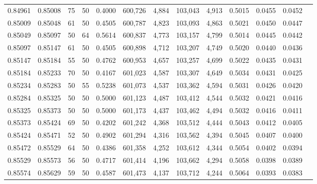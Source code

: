 \begin{tabular}{rrrrrrrrrrrrr}
0.84961 & 0.85008 &    75 &  50 &                                     0.4000 & 600,726 &   4,884 & 103,043 &   4,913 & 0.5015 & 0.0455 & 0.0452 \\
0.85009 & 0.85048 &    61 &  50 &                                     0.4505 & 600,787 &   4,823 & 103,093 &   4,863 & 0.5021 & 0.0450 & 0.0447 \\
0.85049 & 0.85097 &    50 &  64 &                                     0.5614 & 600,837 &   4,773 & 103,157 &   4,799 & 0.5014 & 0.0445 & 0.0442 \\
0.85097 & 0.85147 &    61 &  50 &                                     0.4505 & 600,898 &   4,712 & 103,207 &   4,749 & 0.5020 & 0.0440 & 0.0436 \\
0.85147 & 0.85184 &    55 &  50 &                                     0.4762 & 600,953 &   4,657 & 103,257 &   4,699 & 0.5022 & 0.0435 & 0.0431 \\
0.85184 & 0.85233 &    70 &  50 &                                     0.4167 & 601,023 &   4,587 & 103,307 &   4,649 & 0.5034 & 0.0431 & 0.0425 \\
0.85234 & 0.85283 &    50 &  55 &                                     0.5238 & 601,073 &   4,537 & 103,362 &   4,594 & 0.5031 & 0.0426 & 0.0420 \\
0.85284 & 0.85325 &    50 &  50 &                                     0.5000 & 601,123 &   4,487 & 103,412 &   4,544 & 0.5032 & 0.0421 & 0.0416 \\
0.85325 & 0.85373 &    50 &  50 &                                     0.5000 & 601,173 &   4,437 & 103,462 &   4,494 & 0.5032 & 0.0416 & 0.0411 \\
0.85373 & 0.85424 &    69 &  50 &                                     0.4202 & 601,242 &   4,368 & 103,512 &   4,444 & 0.5043 & 0.0412 & 0.0405 \\
0.85424 & 0.85471 &    52 &  50 &                                     0.4902 & 601,294 &   4,316 & 103,562 &   4,394 & 0.5045 & 0.0407 & 0.0400 \\
0.85472 & 0.85529 &    64 &  50 &                                     0.4386 & 601,358 &   4,252 & 103,612 &   4,344 & 0.5054 & 0.0402 & 0.0394 \\
0.85529 & 0.85573 &    56 &  50 &                                     0.4717 & 601,414 &   4,196 & 103,662 &   4,294 & 0.5058 & 0.0398 & 0.0389 \\
0.85574 & 0.85629 &    59 &  50 &                                     0.4587 & 601,473 &   4,137 & 103,712 &   4,244 & 0.5064 & 0.0393 & 0.0383 \\

\end{tabular}
